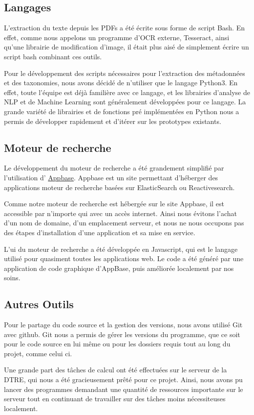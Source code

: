 
\subsection{Langages}
L'extraction du texte depuis les PDFs a été écrite sous forme de script Bash.
En effet, comme nous appelons un programme d'\gls{OCR} externe, Tesseract, ainsi qu'une librairie de modification d'image, il était plus aisé de simplement écrire un script bash combinant ces outils.

Pour le développement des scripts nécessaires pour l'extraction des métadonnées et des taxonomies, nous avons décidé de n'utiliser que le langage Python3.
En effet, toute l'équipe est déjà familière avec ce langage, et les librairies d'analyse de \gls{NLP} et de Machine Learning sont généralement développées pour ce langage.
La grande variété de librairies et de fonctions pré implémentées en Python nous a permis de développer rapidement et d'itérer sur les prototypes existants. 

\subsection{Moteur de recherche}
Le développement du moteur de recherche a été grandement simplifié par l'utilisation d' \href{https://appbase.io}{Appbase}.
Appbase est un site permettant d'héberger des applications moteur de recherche basées sur ElasticSearch ou Reactivesearch.

Comme notre moteur de recherche est hébergée sur le site Appbase, il est accessible par n'importe qui avec un accès internet.
Ainsi nous évitons l'achat d'un nom de domaine, d'un emplacement serveur, et nous ne nous occupons pas des étapes d'installation d'une application et sa mise en service. 

L'\gls{ui} du moteur de recherche a été développée en Javascript, qui est le langage utilisé pour quasiment toutes les applications web. 
Le code a été généré par une application de code graphique d'AppBase, puis améliorée localement par nos soins.

\subsection{Autres Outils}
Pour le partage du code source et la gestion des versions, nous avons utilisé Git avec github.
Git nous a permis de gérer les versions du programme, que ce soit pour le code source en lui même ou pour les dossiers requis tout au long du projet, comme celui ci. 

Une grande part des tâches de calcul ont été effectuées sur le serveur de la DTRE, qui nous a été gracieusement prêté pour ce projet.
Ainsi, nous avons pu lancer des programmes demandant une quantité de ressources importante sur le serveur tout en continuant de travailler sur des tâches moins nécessiteuses localement.




